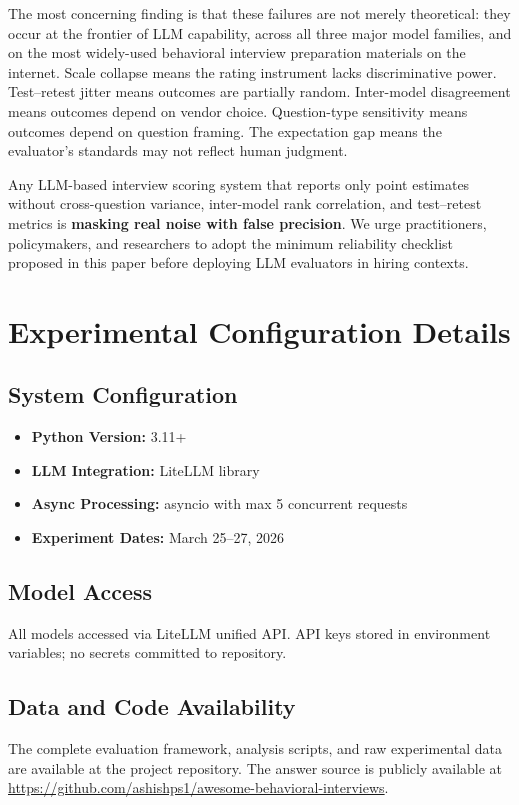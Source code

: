\documentclass{article}
\begin{document}
The most concerning finding is that these failures are not merely theoretical: they occur at the frontier of LLM capability, across all three major model families, and on the most widely-used behavioral interview preparation materials on the internet. Scale collapse means the rating instrument lacks discriminative power. Test--retest jitter means outcomes are partially random. Inter-model disagreement means outcomes depend on vendor choice. Question-type sensitivity means outcomes depend on question framing. The expectation gap means the evaluator's standards may not reflect human judgment.

Any LLM-based interview scoring system that reports only point estimates without cross-question variance, inter-model rank correlation, and test--retest metrics is \textbf{masking real noise with false precision}. We urge practitioners, policymakers, and researchers to adopt the minimum reliability checklist proposed in this paper before deploying LLM evaluators in hiring contexts.




\appendix

\section{Experimental Configuration Details}

\subsection{System Configuration}
\begin{itemize}
  \item \textbf{Python Version:} 3.11+
  \item \textbf{LLM Integration:} LiteLLM library
  \item \textbf{Async Processing:} asyncio with max 5 concurrent requests
  \item \textbf{Experiment Dates:} March 25--27, 2026
\end{itemize}

\subsection{Model Access}
All models accessed via LiteLLM unified API. API keys stored in environment variables; no secrets committed to repository.

\subsection{Data and Code Availability}
The complete evaluation framework, analysis scripts, and raw experimental data are available at the project repository. The answer source is publicly available at \url{https://github.com/ashishps1/awesome-behavioral-interviews}.
\end{document}
